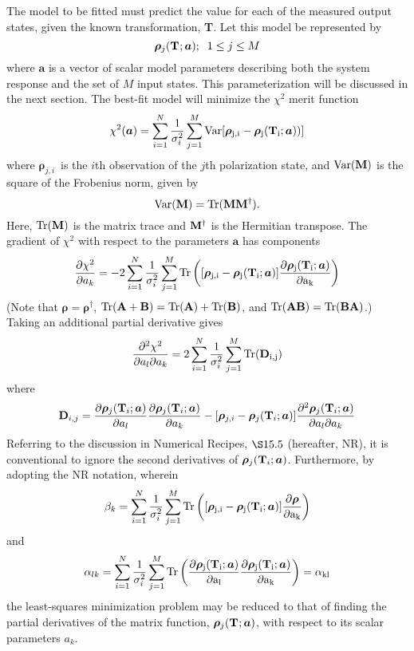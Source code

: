 \documentclass[12pt]{article}
\newcommand{\mbf}[1]{\mbox{\boldmath $#1$}}
\newcommand{\var}{\rm Var}
\newcommand{\trace}{\rm Tr}
\newcommand{\model}[1][ ]{\ensuremath{{\bm\rho}_j({{\bf T}_{#1}};{\mbf{a}}) }}
\newcommand{\obs}{\ensuremath{ {\bm\rho}_{j,i} }}
\begin{document}
The model to be fitted must predict the value for each of the measured
output states, given the known transformation, {\bf T}.  Let this model
be represented by
\begin{equation}
\model; \;\; 1\le j\le M
\end{equation}
where $\bm{a}$ is a vector of scalar model parameters describing both
the system response and the set of $M$ input states.  This
parameterization will be discussed in the next section.  The best-fit
model will minimize the $\chi^2$ merit function
\begin{equation}
\chi^2(\bm{a}) = \sum_{i=1}^N {1\over\sigma_i^2} \sum_{j=1}^M
	{\var[\obs - \model[i])]}
\end{equation}
where \obs\ is the $i$th observation of the $j$th
polarization state, and $\var({\bf M})$ is the square of the Frobenius
norm, given by
\begin{equation}
\var({\bf M})=\trace({\bf M}{\bf M}^\dagger).
\end{equation}
Here, $\trace({\bf M})$ is the matrix trace and ${\bf M}^\dagger$ is the
Hermitian transpose.  The gradient of $\chi^2$ with respect to the
parameters $\bm{a}$ has components
\begin{equation}
{\partial\chi^2\over\partial a_k} = -2 \sum_{i=1}^N {1\over\sigma_i^2}
	\sum_{j=1}^M \trace\left( [\obs - \model[i]]
	{\partial\model[i]\over\partial a_k} \right)
\end{equation}
(Note that $\bm\rho=\bm\rho^\dagger$, $\trace({\bf A}+{\bf B})=\trace({\bf
A})+\trace({\bf B})$, and $\trace({\bf AB})=\trace({\bf BA})$.)
Taking an additional partial derivative gives
\begin{equation}
{\partial^2\chi^2\over\partial a_l\partial a_k} = 
	2 \sum_{i=1}^N {1\over\sigma_i^2} \sum_{j=1}^M \trace({\bf D}_{i,j})
\end{equation}
where
\begin{equation}
{\bf D}_{i,j} = 
{\partial\model[i]\over\partial a_l} {\partial\model[i]\over\partial a_k}
	- [\obs - \model[i]] {\partial^2\model[i]\over\partial a_l\partial a_k}
\end{equation}
Referring to the discussion in Numerical Recipes, $\S 15.5$
(hereafter, NR), it is conventional to ignore the second derivatives
of \model[i].  Furthermore, by adopting the NR notation, wherein
\begin{equation}
\beta_k = \sum_{i=1}^N {1\over\sigma_i^2}\sum_{j=1}^M \trace\left(
	[\obs - \model[i]] {\partial{\bm\rho}\over\partial a_k}\right)
\end{equation}
and
\begin{equation}
\alpha_{lk} = \sum_{i=1}^N {1\over\sigma_i^2}\sum_{j=1}^M
	\trace\left( {\partial\model[i]\over\partial a_l}
		{\partial\model[i]\over\partial a_k} \right) = \alpha_{kl}
\end{equation}
the least-squares minimization problem may be reduced to that of
finding the partial derivatives of the matrix function, \model, with
respect to its scalar parameters $a_k$.
\end{document}
